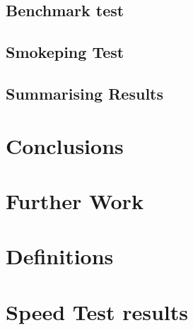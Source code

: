\documentclass[letter, 11pt]{article}
\theoremstyle{plain}
\theoremstyle{definition}
\begin{document}
\subsection{Benchmark test}


\subsection{Smokeping Test}


\subsection{Summarising Results}

\newpage
\section{Conclusions}

\newpage
\section{Further Work}

\newpage
\begin{appendix}
\section{Definitions}\label{app:definitions}

\section{Speed Test results}\label{app:bwmeasures}

\newpage
\end{appendix}
{}
\end{document}
